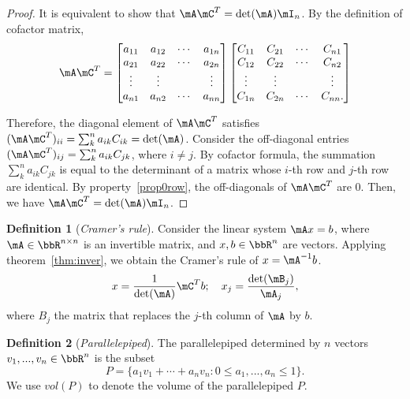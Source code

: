 \documentclass[11pt]{article}
\theoremstyle{plain}
\theoremstyle{definition}
\newtheorem{defn}{Definition}
\begin{document}
\begin{proof}
	It is equivalent to  show that $\mA \mC^T = \det(\mA) \mI_n$. By the definition of cofactor matrix,
	\begin{align}
		\mA  \mC^T = \begin{bmatrix}
			a_{11} & a_{12} &\cdots &a_{1n}\\
			a_{21} & a_{22} &\cdots &a_{2n}\\
			\vdots & \vdots & & \vdots\\
			a_{n1} & a_{n2} &\cdots &a_{nn}\\
		\end{bmatrix} \begin{bmatrix}
			C_{11} & C_{21} &\cdots &C_{n1}\\
			C_{12} & C_{22} &\cdots &C_{n2}\\
			\vdots & \vdots & & \vdots\\
			C_{1n} & C_{2n} &\cdots &C_{nn}.\\
		\end{bmatrix}
	\end{align}
	
	Therefore, the diagonal element of $\mA \mC^T$ satisfies $(\mA \mC^T)_{ii} = \sum_k^n a_{ik} C_{ik} = \det(\mA)$. Consider the off-diagonal entries $(\mA \mC^T)_{ij} = \sum_{k}^n a_{ik} C_{jk}$, where $i \neq j$. By cofactor formula, the summation   $ \sum_{k}^n a_{ik} C_{jk}$ is equal to the determinant of a matrix whose $i$-th row and $j$-th row are identical. By property~\ref{prop0row}, the off-diagonals of $\mA \mC^T$ are 0. Then, we have $\mA \mC^T = \det(\mA) \mI_n$.
\end{proof}

\begin{defn}[\textit{Cramer's rule}]
Consider the linear system $\mA x=b$, where $\mA\in\bbR^{n \times n}$ is an invertible matrix, and $ x, b \in \bbR^n$ are vectors. Applying theorem~\ref{thm:inver}, we obtain the Cramer's rule of $x = \mA^{-1} b$.
\[  x = \frac{1}{\det(\mA)} \mC^T b; \quad x_j = \frac{\det(\mB_j)}{\mA_j}, \] 
	where $B_j$ the matrix that replaces the $j$-th column of $\mA$ by $b$.
\end{defn}

\begin{defn}[\textit{Parallelepiped}]
	The parallelepiped determined by $n$ vectors $v_1,...,v_n \in \bbR^n$ is the subset 
	\[ P = \{ a_1 v_1 + \cdots + a_n v_n : 0 \leq a_1,...,a_n \leq 1 \}. \]
	 We use $vol(P)$ to denote the volume of the parallelepiped  $P$. 
\end{defn}
\end{document}

